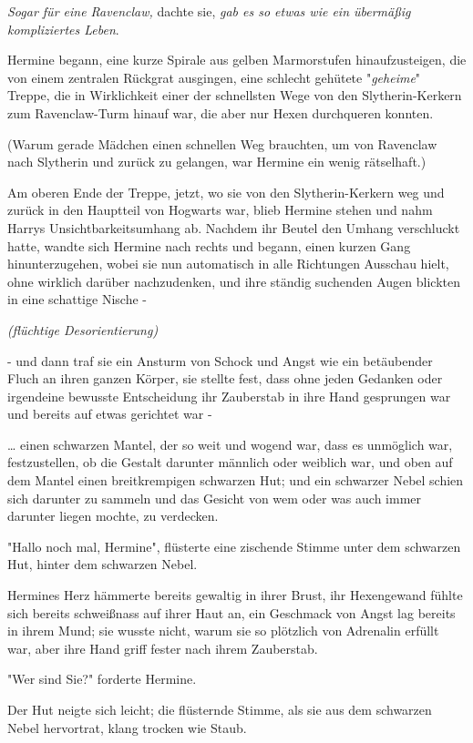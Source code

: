 {\emph{Sogar für eine Ravenclaw,} dachte sie, \emph{gab es so etwas wie ein übermäßig kompliziertes Leben}.

Hermine begann, eine kurze Spirale aus gelben Marmorstufen hinaufzusteigen, die von einem zentralen Rückgrat ausgingen, eine schlecht gehütete "\emph{geheime}" Treppe, die in Wirklichkeit einer der schnellsten Wege von den Slytherin-Kerkern zum Ravenclaw-Turm hinauf war, die aber nur Hexen durchqueren konnten.

(Warum gerade Mädchen einen schnellen Weg brauchten, um von Ravenclaw nach Slytherin und zurück zu gelangen, war Hermine ein wenig rätselhaft.)

Am oberen Ende der Treppe, jetzt, wo sie von den Slytherin-Kerkern weg und zurück in den Hauptteil von Hogwarts war, blieb Hermine stehen und nahm Harrys Unsichtbarkeitsumhang ab. Nachdem ihr Beutel den Umhang verschluckt hatte, wandte sich Hermine nach rechts und begann, einen kurzen Gang hinunterzugehen, wobei sie nun automatisch in alle Richtungen Ausschau hielt, ohne wirklich darüber nachzudenken, und ihre ständig suchenden Augen blickten in eine schattige Nische -

\emph{(flüchtige Desorientierung)}

- und dann traf sie ein Ansturm von Schock und Angst wie ein betäubender Fluch an ihren ganzen Körper, sie stellte fest, dass ohne jeden Gedanken oder irgendeine bewusste Entscheidung ihr Zauberstab in ihre Hand gesprungen war und bereits auf etwas gerichtet war -

… einen schwarzen Mantel, der so weit und wogend war, dass es unmöglich war, festzustellen, ob die Gestalt darunter männlich oder weiblich war, und oben auf dem Mantel einen breitkrempigen schwarzen Hut; und ein schwarzer Nebel schien sich darunter zu sammeln und das Gesicht von wem oder was auch immer darunter liegen mochte, zu verdecken.

"Hallo noch mal, Hermine", flüsterte eine zischende Stimme unter dem schwarzen Hut, hinter dem schwarzen Nebel.

Hermines Herz hämmerte bereits gewaltig in ihrer Brust, ihr Hexengewand fühlte sich bereits schweißnass auf ihrer Haut an, ein Geschmack von Angst lag bereits in ihrem Mund; sie wusste nicht, warum sie so plötzlich von Adrenalin erfüllt war, aber ihre Hand griff fester nach ihrem Zauberstab.

"Wer sind Sie?" forderte Hermine.

Der Hut neigte sich leicht; die flüsternde Stimme, als sie aus dem schwarzen Nebel hervortrat, klang trocken wie Staub.

}
